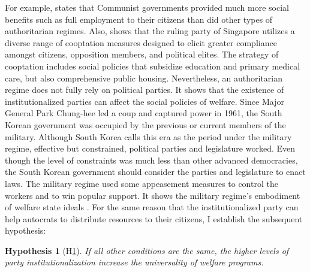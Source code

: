 \documentclass[11pt]{article}
\newtheorem{hyp}{Hypothesis}
\begin{document}
For example, \citet{Orenstein2008} states that Communist governments provided much more social benefits such as full employment to their citizens than did other types of authoritarian regimes. Also, \citet{Morgenbesser2017} shows that the ruling party of Singapore utilizes a diverse range of cooptation measures designed to elicit greater compliance amongst citizens, opposition members, and political elites. The strategy of cooptation includes social policies that subsidize education and primary medical care, but also comprehensive public housing. Nevertheless, an authoritarian regime does not fully rely on political parties. It shows that the existence of institutionalized parties can affect the social policies of welfare. Since Major General Park Chung-hee led a coup and captured power in 1961, the South Korean government was occupied by the previous or current members of the military. Although South Korea calls this era as the period under the military regime, effective but constrained, political parties and legislature worked. Even though the level of constraints was much less than other advanced democracies, the South Korean government should consider the parties and legislature to enact laws. The military regime used some appeasement measures to control the workers and to win popular support. It shows the military regime’s embodiment of welfare state ideals \citep[90-93]{Tang2000}. For the same reason that the institutionalized party can help autocrats to distribute resources to their citizens, I establish the subsequent hypothesis:\par

\begin{hyp}[H\ref{hyp:third}] \label{hyp:third}
	If all other conditions are the same, the higher levels of party institutionalization increase the universality of welfare programs.
\end{hyp}
\end{document}
